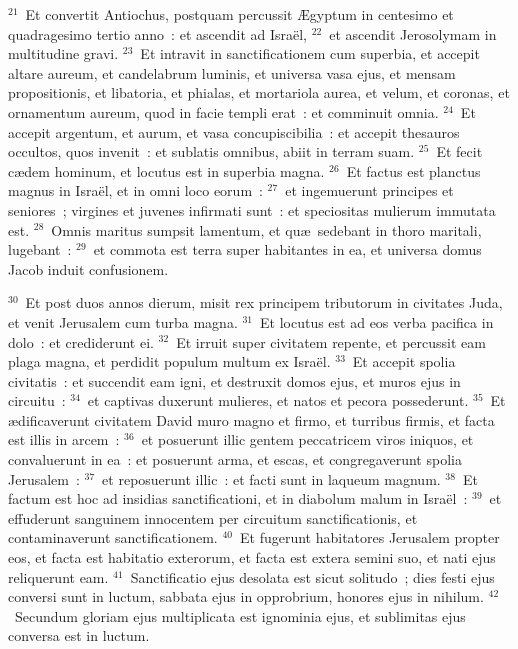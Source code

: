 ${}^{21}$~Et convertit Antiochus, postquam percussit \AE gyptum in centesimo et quadragesimo tertio anno~: et ascendit ad Isra\"el,
${}^{22}$~et ascendit Jerosolymam in multitudine gravi.
${}^{23}$~Et intravit in sanctificationem cum superbia, et accepit altare aureum, et candelabrum luminis, et universa vasa ejus, et mensam propositionis, et libatoria, et phialas, et mortariola aurea, et velum, et coronas, et ornamentum aureum, quod in facie templi erat~: et comminuit omnia.
${}^{24}$~Et accepit argentum, et aurum, et vasa concupiscibilia~: et accepit thesauros occultos, quos invenit~: et sublatis omnibus, abiit in terram suam.
${}^{25}$~Et fecit c\ae dem hominum, et locutus est in superbia magna.
${}^{26}$~Et factus est planctus magnus in Isra\"el, et in omni loco eorum~:
${}^{27}$~et ingemuerunt principes et seniores~; virgines et juvenes infirmati sunt~: et speciositas mulierum immutata est.
${}^{28}$~Omnis maritus sumpsit lamentum, et qu\ae\ sedebant in thoro maritali, lugebant~:
${}^{29}$~et commota est terra super habitantes in ea, et universa domus Jacob induit confusionem.


${}^{30}$~Et post duos annos dierum, misit rex principem tributorum in civitates Juda, et venit Jerusalem cum turba magna.
${}^{31}$~Et locutus est ad eos verba pacifica in dolo~: et crediderunt ei.
${}^{32}$~Et irruit super civitatem repente, et percussit eam plaga magna, et perdidit populum multum ex Isra\"el.
${}^{33}$~Et accepit spolia civitatis~: et succendit eam igni, et destruxit domos ejus, et muros ejus in circuitu~:
${}^{34}$~et captivas duxerunt mulieres, et natos et pecora possederunt.
${}^{35}$~Et \ae dificaverunt civitatem David muro magno et firmo, et turribus firmis, et facta est illis in arcem~:
${}^{36}$~et posuerunt illic gentem peccatricem viros iniquos, et convaluerunt in ea~: et posuerunt arma, et escas, et congregaverunt spolia Jerusalem~:
${}^{37}$~et reposuerunt illic~: et facti sunt in laqueum magnum.
${}^{38}$~Et factum est hoc ad insidias sanctificationi, et in diabolum malum in Isra\"el~:
${}^{39}$~et effuderunt sanguinem innocentem per circuitum sanctificationis, et contaminaverunt sanctificationem.
${}^{40}$~Et fugerunt habitatores Jerusalem propter eos, et facta est habitatio exterorum, et facta est extera semini suo, et nati ejus reliquerunt eam.
${}^{41}$~Sanctificatio ejus desolata est sicut solitudo~; dies festi ejus conversi sunt in luctum, sabbata ejus in opprobrium, honores ejus in nihilum.
${}^{42}$~Secundum gloriam ejus multiplicata est ignominia ejus, et sublimitas ejus conversa est in luctum.


